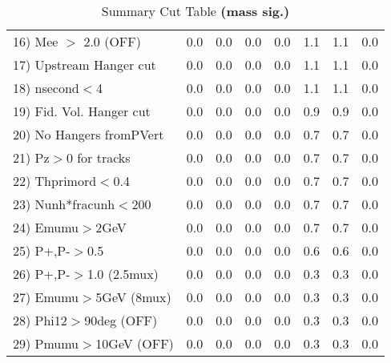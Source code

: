 \begin{table}[h!]
{{\begin{tabular}{||l||r|r|r|r|r||r||r||}
 16) Mee $>$ 2.0  (OFF)   &       0.0 &       0.0 &       0.0 &       0.0 &       1.1 &       1.1 &       0.0 \\
 17) Upstream Hanger cut  &       0.0 &       0.0 &       0.0 &       0.0 &       1.1 &       1.1 &       0.0 \\
 18) nsecond$<$4          &       0.0 &       0.0 &       0.0 &       0.0 &       1.1 &       1.1 &       0.0 \\
 19) Fid. Vol. Hanger cut &       0.0 &       0.0 &       0.0 &       0.0 &       0.9 &       0.9 &       0.0 \\
 20) No Hangers fromPVert &       0.0 &       0.0 &       0.0 &       0.0 &       0.7 &       0.7 &       0.0 \\
 21) Pz$>$0 for tracks    &       0.0 &       0.0 &       0.0 &       0.0 &       0.7 &       0.7 &       0.0 \\
 22) Thprimord$<$0.4      &       0.0 &       0.0 &       0.0 &       0.0 &       0.7 &       0.7 &       0.0 \\
 23) Nunh*fracunh$<$200   &       0.0 &       0.0 &       0.0 &       0.0 &       0.7 &       0.7 &       0.0 \\
 24) Emumu$>$2GeV         &       0.0 &       0.0 &       0.0 &       0.0 &       0.7 &       0.7 &       0.0 \\
 25) P+,P-$>$0.5          &       0.0 &       0.0 &       0.0 &       0.0 &       0.6 &       0.6 &       0.0 \\
 26) P+,P-$>$1.0 (2.5mux) &       0.0 &       0.0 &       0.0 &       0.0 &       0.3 &       0.3 &       0.0 \\
 27) Emumu$>$5GeV  (8mux) &       0.0 &       0.0 &       0.0 &       0.0 &       0.3 &       0.3 &       0.0 \\
 28) Phi12$>$90deg  (OFF) &       0.0 &       0.0 &       0.0 &       0.0 &       0.3 &       0.3 &       0.0 \\
 29) Pmumu$>$10GeV  (OFF) &       0.0 &       0.0 &       0.0 &       0.0 &       0.3 &       0.3 &       0.0 \\
 \hline
 \hline
 \end{tabular}
 \caption{Summary Cut Table \textbf{ (mass sig.) }}
 \label{tab-sumcut}
 }}
 \end{table}
 \endinput
